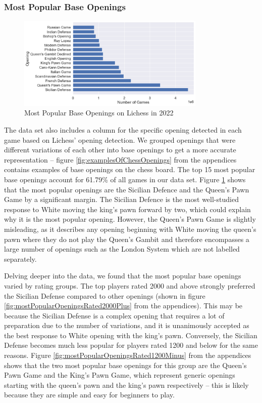 \documentclass[a4paper, 11pt]{article}
\begin{document}
\subsubsection{Most Popular Base Openings}
\begin{figure}[H]
    \centering
    \caption{Most Popular Base Openings on Lichess in 2022}
    \label{fig:mostPopularOpenings}
    \includegraphics[width=0.8\textwidth]{Most Popular Base Openings.png}
\end{figure}

The data set also includes a column for the specific opening detected in each game based on Lichess' opening detection. We grouped openings that were different variations of each other into base openings to get a more accurate representation -- figure \ref{fig:examplesOfChessOpenings} from the appendices contains examples of base openings on the chess board. The top 15 most popular base openings account for 61.79\% of all games in our data set. Figure \ref{fig:mostPopularOpenings} shows that the most popular openings are the Sicilian Defence and the Queen's Pawn Game by a significant margin. The Sicilian Defence is the most well-studied response to White moving the king's pawn forward by two, which could explain why it is the most popular opening. However, the Queen's Pawn Game is slightly misleading, as it describes any opening beginning with White moving the queen's pawn where they do not play the Queen's Gambit and therefore encompasses a large number of openings such as the London System which are not labelled separately.

Delving deeper into the data, we found that the most popular base openings varied by rating groups. The top players rated 2000 and above strongly preferred the Sicilian Defense compared to other openings (shown in figure \ref{fig:mostPopularOpeningsRated2000Plus} from the appendices). This may be because the Sicilian Defense is a complex opening that requires a lot of preparation due to the number of variations, and it is unanimously accepted as the best response to White opening with the king's pawn. Conversely, the Sicilian Defense becomes much less popular for players rated 1200 and below for the same reasons. Figure \ref{fig:mostPopularOpeningsRated1200Minus} from the appendices shows that the two most popular base openings for this group are the Queen's Pawn Game and the King's Pawn Game, which represent generic openings starting with the queen's pawn and the king's pawn respectively -- this is likely because they are simple and easy for beginners to play.
\end{document}
